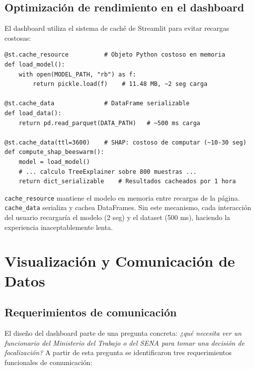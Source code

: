 \documentclass[12pt, a4paper]{article}
\begin{document}
\subsection{Optimización de rendimiento en el dashboard}

El dashboard utiliza el sistema de caché de Streamlit para evitar recargas costosas:

\begin{lstlisting}[caption={Estrategia de caché en app.py}]
@st.cache_resource          # Objeto Python costoso en memoria
def load_model():
    with open(MODEL_PATH, "rb") as f:
        return pickle.load(f)    # 11.48 MB, ~2 seg carga

@st.cache_data              # DataFrame serializable
def load_data():
    return pd.read_parquet(DATA_PATH)   # ~500 ms carga

@st.cache_data(ttl=3600)    # SHAP: costoso de computar (~10-30 seg)
def compute_shap_beeswarm():
    model = load_model()
    # ... calculo TreeExplainer sobre 800 muestras ...
    return dict_serializable    # Resultados cacheados por 1 hora
\end{lstlisting}

\texttt{cache\_resource} mantiene el modelo en memoria entre recargas de la página.
\texttt{cache\_data} serializa y cachea DataFrames. Sin este mecanismo, cada
interacción del usuario recargaría el modelo (2 seg) y el dataset (500 ms), haciendo
la experiencia inaceptablemente lenta.

\section{Visualización y Comunicación de Datos}
\label{sec:viz}

\subsection{Requerimientos de comunicación}

El diseño del dashboard parte de una pregunta concreta: \textit{¿qué necesita
ver un funcionario del Ministerio del Trabajo o del SENA para tomar una decisión
de focalización?} A partir de esta pregunta se identificaron tres requerimientos
funcionales de comunicación:
\end{document}
